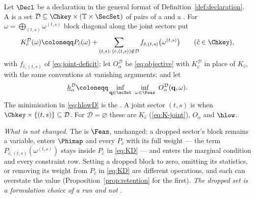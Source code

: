 \begin{definition}\label{def:dropped}
Let $\Decl$ be a declaration in the general format of
Definition~\ref{def:declaration}. A
is a set
$\mathcal{D}\subseteq\Chkey\times(\mathbb{T}\times\SecSet)$ of pairs of a
 and a . For
$\omega=\bigoplus_{(t,s)}\omega^{(t,s)}$ block diagonal along the joint
sectors put
\begin{equation}\label{eq:KD}
  K^{\mathcal{D}}_{\hat c}(\omega)\coloneqq P_{\hat c}(\omega)
  +\sum_{(t,s):\,(\hat c,(t,s))\notin\mathcal{D}}
  f_{\hat c,(t,s)}\big(\omega^{(t,s)}\big)
  \qquad(\hat c\in\Chkey),
\end{equation}
with $f_{\hat c,(t,s)}$ of \eqref{eq:joint-deficit}; let
$O^{\mathcal{D}}_{\alpha}$ be \eqref{eq:objective} with
$K^{\mathcal{D}}_{\hat c}$ in place of $K_{\hat c}$, with the same
conventions at vanishing arguments; and let
\begin{equation}\label{eq:hlowD}
  \underline{h}^{\mathcal{D}}_{\alpha}\coloneqq
  \inf_{\mathbf q\in\acSet}\ \inf_{\omega\in\Feas}\
  O^{\mathcal{D}}_{\alpha}(\mathbf q,\omega).
\end{equation}
The minimisation in \eqref{eq:hlowD} is the
.
A joint sector $(t,s)$ is
when $\Chkey\times\{(t,s)\}\subseteq\mathcal{D}$. For
$\mathcal{D}=\varnothing$ these are $K_{\hat c}$ (\eqref{eq:K-joint}),
$O_{\alpha}$ and $\hlow$.

\emph{What is not changed.} The  is $\Feas$, unchanged: a
dropped sector's block remains a variable, enters $\Phimap$ and every
$P_{\hat c}$ with its full weight --- the term
$P_{\hat c,(t,s)}(\omega^{(t,s)})$ stays inside $P_{\hat c}$ in
\eqref{eq:KD} --- and enters the marginal condition and every constraint
row. Setting a dropped block to zero, omitting its statistics, or removing
its weight from $P_{\hat c}$ in \eqref{eq:KD} are different operations, and
each can overstate the value (Proposition~\ref{prop:retention} for the
first). \emph{The dropped set is a formulation choice of a run and not
\tref{declared data}}.
\end{definition}
